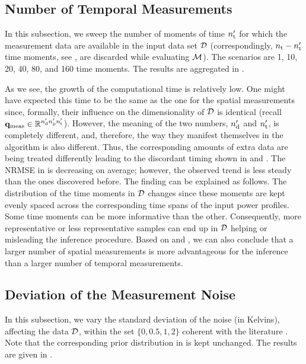 \subsection{Number of Temporal Measurements}
In this subsection, we sweep the number of moments of time ${n_\text{t}'}$ for which the measurement data are available in the input data set $\mathcal{D}$ (correspondingly, ${n_\text{t}} - {n_\text{t}'}$ time moments, see , are discarded while evaluating $\model$). The scenarios are 1, 10, 20, 40, 80, and 160 time moments. The results are aggregated in .


As we see, the growth of the computational time is relatively low. One might have expected this time to be the same as the one for the spatial measurements since, formally, their influence on the dimensionality of $\mathcal{D}$ is identical (recall $\mathbf{q}_{\text{meas}} \in \mathbb{R}^{{n_\text{d}'} {n_\text{p}'} {n_\text{t}'}}$). However, the meaning of the two numbers, ${n_\text{d}'}$ and ${n_\text{t}'}$, is completely different, and, therefore, the way they manifest themselves in the algorithm is also different. Thus, the corresponding amounts of extra data are being treated differently leading to the discordant timing shown in  and .
The NRMSE in  is decreasing on average; however, the observed trend is less steady than the ones discovered before. The finding can be explained as follows. The distribution of the time moments in $\mathcal{D}$ changes since these moments are kept evenly spaced across the corresponding time spans of the input power profiles. Some time moments can be more informative than the other. Consequently, more representative or less representative samples can end up in $\mathcal{D}$ helping or misleading the inference procedure.
Based on  and , we can also conclude that a larger number of spatial measurements is more advantageous for the inference than a larger number of temporal measurements.

\subsection{Deviation of the Measurement Noise}
In this subsection, we vary the standard deviation of the noise (in Kelvins), affecting the data $\mathcal{D}$, within the set $\{ 0, 0.5, 1, 2 \}$ coherent with the literature \cite{mesa-martinez2007}. Note that the corresponding prior distribution in  is kept unchanged. The results are given in .


